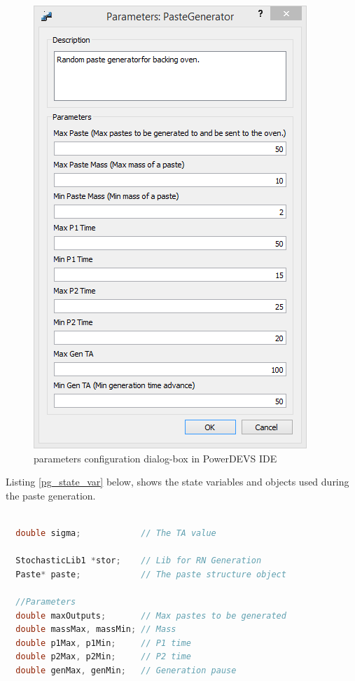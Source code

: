 \documentclass[titlepage]{report}%
\begin{document}
{\begin{figure}[htbp]
	\centering
		\includegraphics[scale=0.8]{pastegen_params.PNG}
	\caption{{} parameters configuration dialog-box in PowerDEVS IDE}
	\label{fig:pastegen_params}
\end{figure}

Listing \ref{pg_state_var} below, shows the state variables and objects used during the paste generation.

\begin{lstlisting}[caption={State variables and objects}, language=c++, label={pg_state_var}]

  double sigma;            // The TA value

  StochasticLib1 *stor;    // Lib for RN Generation
  Paste* paste;            // The paste structure object

  //Parameters
  double maxOutputs;       // Max pastes to be generated
  double massMax, massMin; // Mass
  double p1Max, p1Min;     // P1 time 
  double p2Max, p2Min;     // P2 time
  double genMax, genMin;   // Generation pause


\end{lstlisting}}
\end{document}

